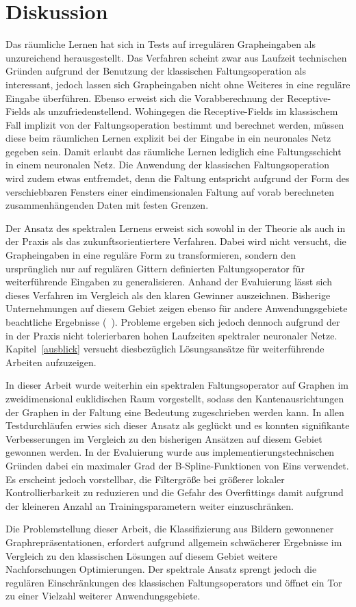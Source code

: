 \section{Diskussion}
\label{diskussion}

Das räumliche Lernen hat sich in Tests auf irregulären Grapheingaben als unzureichend herausgestellt.
Das Verfahren scheint zwar aus Laufzeit technischen Gründen aufgrund der Benutzung der klassischen Faltungsoperation als interessant, jedoch lassen sich Grapheingaben nicht ohne Weiteres in eine reguläre Eingabe überführen.
Ebenso erweist sich die Vorabberechnung der Receptive-Fields als unzufriedenstellend.
Wohingegen die Receptive-Fields im klassischem Fall implizit von der Faltungsoperation bestimmt und berechnet werden, müssen diese beim räumlichen Lernen explizit bei der Eingabe in ein neuronales Netz gegeben sein.
Damit erlaubt das räumliche Lernen lediglich eine Faltungsschicht in einem neuronalen Netz.
Die Anwendung der klassischen Faltungsoperation wird zudem etwas entfremdet, denn die Faltung entspricht aufgrund der Form des verschiebbaren Fensters einer eindimensionalen Faltung auf vorab berechneten zusammenhängenden Daten mit festen Grenzen.

Der Ansatz des spektralen Lernens erweist sich sowohl in der Theorie als auch in der Praxis als das zukunftsorientiertere Verfahren.
Dabei wird nicht versucht, die Grapheingaben in eine reguläre Form zu transformieren, sondern den ursprünglich nur auf regulären Gittern definierten Faltungsoperator für weiterführende Eingaben zu generalisieren.
Anhand der Evaluierung lässt sich dieses Verfahren im Vergleich als den klaren Gewinner auszeichnen.
Bisherige Unternehmungen auf diesem Gebiet zeigen ebenso für andere Anwendungsgebiete beachtliche Ergebnisse (\vgl{}~\cite{Defferrard, gcn}).
Probleme ergeben sich jedoch dennoch aufgrund der in der Praxis nicht tolerierbaren hohen Laufzeiten spektraler neuronaler Netze.
Kapitel~\ref{ausblick} versucht diesbezüglich Lösungsansätze für weiterführende Arbeiten aufzuzeigen.

In dieser Arbeit wurde weiterhin ein spektralen Faltungsoperator auf Graphen im zweidimensional euklidischen Raum vorgestellt, sodass den Kantenausrichtungen der Graphen in der Faltung eine Bedeutung zugeschrieben werden kann.
In allen Testdurchläufen erwies sich dieser Ansatz als geglückt und es konnten signifikante Verbesserungen im Vergleich zu den bisherigen Ansätzen auf diesem Gebiet gewonnen werden.
In der Evaluierung wurde aus implementierungstechnischen Gründen dabei ein maximaler Grad der B-Spline-Funktionen von Eins verwendet.
Es erscheint jedoch vorstellbar, die Filtergröße bei größerer lokaler Kontrollierbarkeit zu reduzieren und die Gefahr des Overfittings damit aufgrund der kleineren Anzahl an Trainingsparametern weiter einzuschränken.

Die Problemstellung dieser Arbeit, die Klassifizierung aus Bildern gewonnener Graphrepräsentationen, erfordert aufgrund allgemein schwächerer Ergebnisse im Vergleich zu den klassischen Lösungen auf diesem Gebiet weitere Nachforschungen \bzw{} Optimierungen.
Der spektrale Ansatz sprengt jedoch die regulären Einschränkungen des klassischen Faltungsoperators und öffnet ein Tor zu einer Vielzahl weiterer Anwendungsgebiete.
